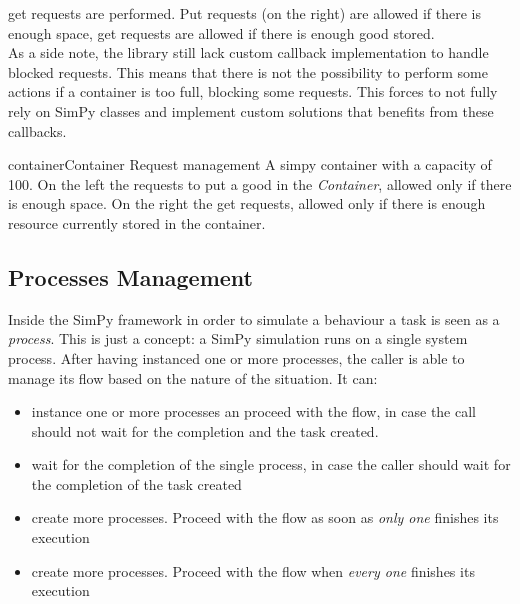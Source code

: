 \begin{itemize}
        get requests are performed. Put requests (on the right) are allowed if
        there is enough space, get requests are allowed if there is enough good
        stored. \\
        As a side note, the library still lack custom callback implementation to
        handle blocked requests. This means that there is not the possibility to
        perform some actions if a container is too full, blocking some requests.
        This forces to not fully rely on SimPy classes and implement custom 
        solutions that benefits from these callbacks.
        \begin{myimage}{container}{Container Request management}
            A simpy container with a capacity of 100. On the left the requests
            to put a good in the \textit{Container}, allowed only if there is
            enough space. On the right the get requests, allowed only if there
            is enough resource
            currently stored in the container.
        \end{myimage}
\end{itemize}

\subsection{Processes Management}
Inside the SimPy framework in order to simulate a behaviour a task is seen as a
\textit{process}. This is just a concept: a SimPy simulation runs on a single system process.
After having instanced one or more processes, the caller is able to manage its flow based on
the nature of the situation. It can:
\begin{itemize}
    \item instance one or more processes an proceed with the flow, in case the
        call should not wait for the completion and the task created.
    \item wait for the completion of the single process, in case the caller
        should wait for the completion of the task created
    \item create more processes. Proceed with the flow as soon as \textit{only
        one} finishes its execution
    \item create more processes. Proceed with the flow when \textit{every one}
        finishes its execution
\end{itemize}


